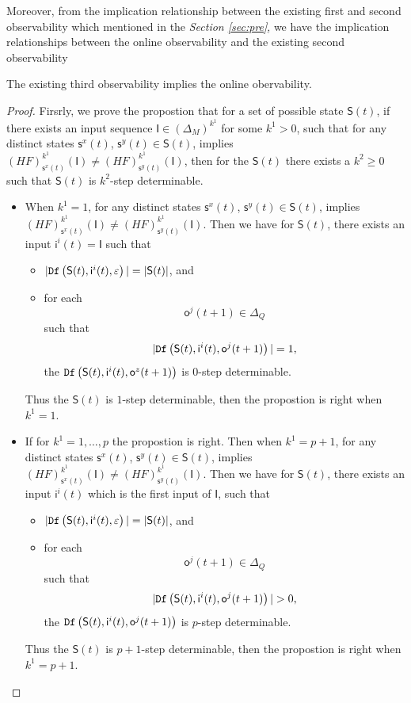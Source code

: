  Moreover, from the implication relationship between the existing first and second observability which mentioned in the {\em Section \ref{sec:pre}}, we have the implication relationships between the online observability and the existing second observability
\begin{lemma}
The existing third observability implies the online obervability.
\end{lemma}
\begin{proof}
Firsrly, we prove the propostion that for a set of possible state $\mathsf{S}(t)$, if there exists an input sequence $\mathsf{I}\in(\Delta_M)^{k^1}$ for some $k^1 >0$, such that for any distinct states $\mathsf{s}^{x}(t)$, $\mathsf{s}^{y}(t) \in \mathsf{S}(t)$, implies $(HF)^{k^1}_{\mathsf{s}^{x}(t)}(\mathsf{I})\neq (HF)^{k^1}_{\mathsf{s}^{y}(t)}(\mathsf{I})$, then for the $\mathsf{S}(t)$ there exists a $k^{2}\ge 0$ such that $\mathsf{S}(t)$ is $k^{2}$-step determinable.

\begin{itemize}
\item When $k^1=1$, for any distinct states $\mathsf{s}^{x}(t)$, $\mathsf{s}^{y}(t) \in \mathsf{S}(t)$, implies $(HF)^{k^1}_{\mathsf{s}^{x}(t)}(\mathsf{I})\neq (HF)^{k^1}_{\mathsf{s}^{y}(t)}(\mathsf{I})$. Then we have for $\mathsf{S}(t)$,
 there exists an input $\mathsf{i}^{i}(t)=\mathsf{I}$ such that
 \begin{itemize}
 \item  $|{\tt Df}\left(\mathsf{S}(t),\mathsf{i}^{i}(t),\varepsilon\right)|=|\mathsf{S}(t)|$, and 
 \item  for each \[\mathsf{o}^{j}(t+1)\in \Delta_Q\] such that \[|{\tt Df}\left(\mathsf{S}(t),\mathsf{i}^{i}(t),\mathsf{o}^{j}(t+1)\right)|=1,\] the ${\tt Df}\left(\mathsf{S}(t),\mathsf{i}^{i}(t),\mathsf{o}^{z}(t+1)\right)$ is $0$-step determinable.
 \end{itemize}
Thus the $\mathsf{S}(t)$ is $1$-step determinable, then the propostion is right when $k^1 =1$.

\item If for $k^1=1,\ldots, p$ the propostion is right. Then when $k^1=p+1$, for any distinct states $\mathsf{s}^{x}(t)$, $\mathsf{s}^{y}(t) \in \mathsf{S}(t)$, implies $(HF)^{k^1}_{\mathsf{s}^{x}(t)}(\mathsf{I})\neq (HF)^{k^1}_{\mathsf{s}^{y}(t)}(\mathsf{I})$. Then we have for $\mathsf{S}(t)$,
 there exists an input $\mathsf{i}^{i}(t)$ which is the first input of $\mathsf{I}$, such that
 \begin{itemize}
\item  $|{\tt Df}\left(\mathsf{S}(t),\mathsf{i}^{i}(t),\varepsilon\right)|=|\mathsf{S}(t)|$, and 
 \item  for each \[\mathsf{o}^{j}(t+1)\in \Delta_Q\] such that \[|\Ded\left(\mathsf{S}(t),\mathsf{i}^{i}(t),\mathsf{o}^{j}(t+1)\right)|>0,\]  the ${\tt Df}\left(\mathsf{S}(t),\mathsf{i}^{i}(t),\mathsf{o}^{j}(t+1)\right)$ is $p$-step determinable.
 \end{itemize}
Thus the $\mathsf{S}(t)$ is $p+1$-step determinable, then the propostion is right when $k^1 =p+1$.


\end{itemize}
\end{proof}
